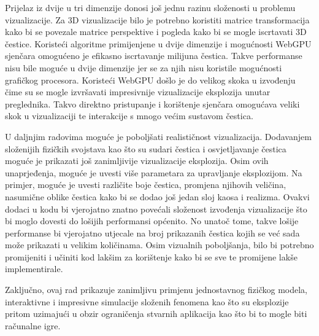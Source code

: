 \documentclass{foi}
\begin{document}
Prijelaz iz dvije u tri dimenzije donosi još jednu razinu složenosti u problemu vizualizacije. Za 3D vizualizacije bilo je potrebno koristiti matrice transformacija kako bi se povezale matrice perspektive i pogleda kako bi se mogle iscrtavati 3D čestice. Koristeći algoritme primijenjene u dvije dimenzije i mogućnosti WebGPU sjenčara omogućeno je efikasno iscrtavanje milijuna čestica. Takve performanse nisu bile moguće u dvije dimenzije jer se za njih nisu koristile mogućnosti grafičkog procesora. Koristeći WebGPU došlo je do velikog skoka u izvođenju čime su se mogle izvršavati impresivnije vizualizacije eksplozija unutar preglednika. Takvo direktno pristupanje i korištenje sjenčara omogućava veliki skok u vizualizaciji te interakcije s mnogo većim sustavom čestica. 

U daljnjim radovima moguće je poboljšati realističnost vizualizacija. Dodavanjem složenijih fizičkih svojstava kao što su sudari čestica i osvjetljavanje čestica moguće je prikazati još zanimljivije vizualizacije eksplozija. Osim ovih unaprjeđenja, moguće je uvesti više parametara za upravljanje eksplozijom. Na primjer, moguće je uvesti različite boje čestica, promjena njihovih veličina, nasumične oblike čestica kako bi se dodao još jedan sloj kaosa i realizma. Ovakvi dodaci u kodu bi vjerojatno znatno povećali složenost izvođenja vizualizacije što bi moglo dovesti do lošijih performansi općenito. No unatoč tome, takve lošije performanse bi vjerojatno utjecale na broj prikazanih čestica kojih se već sada može prikazati u velikim količinama. Osim vizualnih poboljšanja, bilo bi potrebno promijeniti i učiniti kod lakšim za korištenje kako bi se sve te promijene lakše implementirale.

Zaključno, ovaj rad prikazuje zanimljivu primjenu jednostavnog fizičkog modela, interaktivne i impresivne simulacije složenih fenomena kao što su eksplozije pritom uzimajući u obzir ograničenja stvarnih aplikacija kao što bi to mogle biti računalne igre.

\printbibliography[title=Popis literature]

\listoffigures
{}

\appendix
\renewcommand{\thechapter}{\arabic{chapter}}
\end{document}
